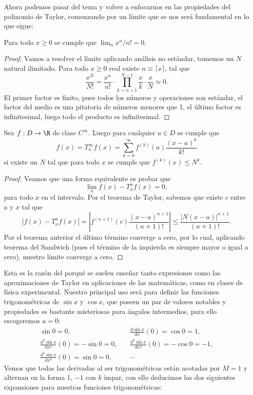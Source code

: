 \documentclass[11pt,oneside,a4paper]{book}
\begin{document}
Ahora podemos pasar del tema y volver a enfocarnos en las propiedades del polinomio de Taylor, comenzando por un límite que se nos será fundamental en lo que sigue:
\begin{thm}
Para todo $x\geq 0$ se cumple que $\lim_n x^n/n!=0$.
\end{thm}
\begin{proof}
Vamos a resolver el límite aplicando análisis no estándar, tomemos un $N$ natural ilimitado. Para todo $x\geq 0$ real existe $n\equiv\lceil x\rceil$, tal que
$$\frac{x^N}{N!}=\frac{x^n}{n!}\cdot\prod_{k=n+1}^{N-1}\frac{x}{k}\cdot\frac{x}{N}\simeq 0.$$
El primer factor es finito, pues todos los números y operaciones son estándar, el factor del medio es una pitatoria de números menores que 1, el último factor es infinitesimal, luego todo el producto es infinitesimal.
\end{proof}
\begin{thm}
Sea $f:D\rightarrow\R$ de clase $C^\infty$. Luego para cualquier $a\in D$ se cumple que
$$f(x)=T^\infty_af(x)=\sum_{k=0}^\infty f^{(k)}(a)\frac{(x-a)^k}{k!}$$
si existe un $N$ tal que para todo $x$ se cumple que $f^{(k)}(x)\leq N^k$.
\end{thm}
\begin{proof}
Veamos que una forma equivalente es probar que
$$\lim_n f(x)-T^n_af(x)=0,$$
para todo $x$ en el intervalo. Por el teorema de Taylor, sabemos que existe $c$ entre $a$ y $x$ tal que
$$|f(x)-T^n_af(x)|=\left|f^{(n+1)}(c)\frac{(x-a)^{n+1}}{(n+1)!}\right|\leq\frac{|N(x-a)|^{n+1}}{(n+1)!}.$$
Por el teorema anterior el último término converge a cero, por lo cual, aplicando teorema del Sandwich (pues el término de la izquierda es siempre mayor o igual a cero), nuestro límite converge a cero.
\end{proof}
Esta es la razón del porqué se suelen enseñar tanto expresiones como las aproximaciones de Taylor en aplicaciones de las matemáticas, como en clases de física experimental. Nuestro principal uso será para definir las funciones trigonométricas de $\sin x$ y $\cos x$, que poseen un par de valores notables y propiedades es bastante misteriosas para ángulos intermedios, para ello escogeremos $a=0$:
\begin{align*}
\sin 0=0,&\quad\frac{d\sin x}{dx}(0)=\cos 0=1,\\
\frac{d^2\sin x}{dx^2}(0)=-\sin 0=0,&\quad\frac{d^3\sin x}{dx^3}(0)=-\cos 0=-1,\\
\frac{d^4\sin x}{dx^4}(0)=\sin 0=0,&\quad\cdots
\end{align*}
Vemos que todas las derivadas al ser trigonométricas están acotadas por $M=1$ y alternan en la forma 1, $-1$ con $k$ impar, con ello deducimos las dos siguientes expansiones para nuestras funciones trigonométricas:
\end{document}
